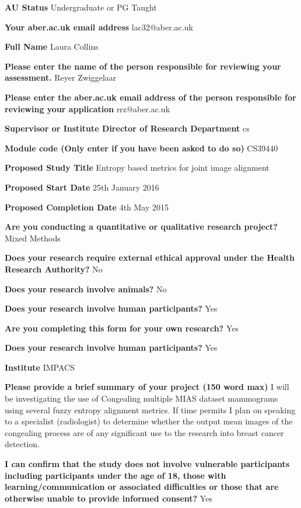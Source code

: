 \iffalse
\noindent \textbf{AU Status}
Undergraduate or PG Taught

\noindent \textbf{Your aber.ac.uk email address}
lac32@aber.ac.uk

\noindent \textbf{Full Name}
Laura Collins

\noindent \textbf{Please enter the name of the person responsible for reviewing your assessment.}
Reyer Zwiggelaar

\noindent \textbf{Please enter the aber.ac.uk email address of the person responsible for reviewing your application}
rrz@aber.ac.uk

\noindent \textbf{Supervisor or Institute Director of Research Department}
cs

\noindent \textbf{Module code (Only enter if you have been asked to do so)}
CS39440

\noindent \textbf{Proposed Study Title}
Entropy based metrics for joint image alignment

\noindent \textbf{Proposed Start Date}
25th January 2016

\noindent \textbf{Proposed Completion Date}
4th May 2015

\noindent \textbf{Are you conducting a quantitative or qualitative research project?}
Mixed Methods

\noindent \textbf{Does your research require external ethical approval under the Health Research Authority?}
No

\noindent \textbf{Does your research involve animals?}
No

\noindent \textbf{Does your research involve human participants?}
Yes

\noindent \textbf{Are you completing this form for your own research?}
Yes

\noindent \textbf{Does your research involve human participants?}
Yes

\noindent \textbf{Institute}
IMPACS

\noindent \textbf{Please provide a brief summary of your project (150 word max)}
I will be investigating the use of Congealing multiple MIAS dataset mammograms using several fuzzy entropy alignment metrics. If time permits I plan on speaking to a specialist (radiologist) to determine whether the output mean images of the congealing process are of any significant use to the research into breast cancer detection.

\noindent \textbf{I can confirm that the study does not involve vulnerable participants including participants under the age of 18, those with learning/communication or associated difficulties or those that are otherwise unable to provide informed consent?}
Yes

